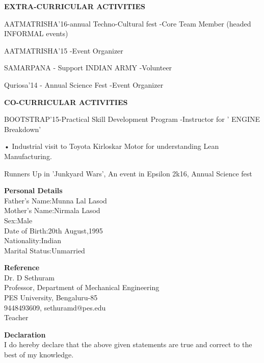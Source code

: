 \documentclass{article}
\begin{document}
\begin{center}

\textbf{\LARGE EXTRA-CURRICULAR ACTIVITIES}
\begin{itemize}
	{\large \item AATMATRISHA'16-annual Techno-Cultural fest
		-Core Team Member (headed INFORMAL events) }
	{\large \item AATMATRISHA'15
		-Event Organizer}
	{\large \item SAMARPANA - Support INDIAN ARMY
		-Volunteer }
	{\large \item Quriosa'14 - Annual Science Fest
		-Event Organizer }
\end{itemize}\vspace{15px}


\textbf{\LARGE CO-CURRICULAR ACTIVITIES}
\begin{enumerate}
	{\large \item BOOTSTRAP'15-Practical Skill Development
		Program
		-Instructor for ' ENGINE Breakdown' }
	
	{\large \item •	Industrial visit to Toyota Kirloskar Motor for understanding Lean Manufacturing. }
	{\large \item Runners Up in 'Junkyard Wars',
		An event in Epsilon 2k16, Annual Science fest }
\end{enumerate}\vspace{15px}

\end{center}


\textbf{\LARGE Personal Details}\\
{\normalsize Father's Name:Munna Lal Lasod\\
	Mother's Name:Nirmala Lasod\\
	Sex:Male\\
	Date of Birth:20th August,1995\\
	Nationality:Indian\\
	Marital Status:Unmarried\\}


\textbf{\LARGE Reference}\\
{\normalsize Dr. D  Sethuram\\
	Professor, Department of Mechanical Engineering\\
	PES University, Bengaluru-85\\
	9448493609, sethuramd@pes.edu\\
	Teacher\\}



\textbf{\LARGE Declaration}\\
{\normalsize I do hereby declare that the above given statements are true and correct to the best of my knowledge.\\}
\end{document}
